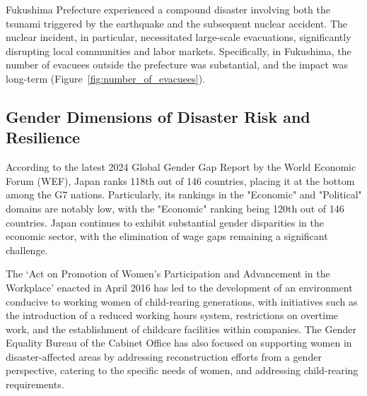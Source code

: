 \documentclass[a4paper,12pt]{article}
\begin{document}
\begin{flushleft}
\begin{table}[h!]
  \vspace{-1.6cm}
\end{table}
\end{flushleft}

Fukushima Prefecture experienced a compound disaster involving both the tsunami triggered by the earthquake and the subsequent nuclear accident. The nuclear incident, in particular, necessitated large-scale evacuations, significantly disrupting local communities and labor markets. Specifically, in Fukushima, the number of evacuees outside the prefecture was substantial, and the impact was long-term (Figure~\ref{fig:number_of_evacuees}). 

\subsection{Gender Dimensions of Disaster Risk and Resilience}
\label{sec5.1}

According to the latest 2024 Global Gender Gap Report by the World Economic Forum (WEF), Japan ranks 118th out of 146 countries, placing it at the bottom among the G7 nations. Particularly, its rankings in the "Economic" and "Political" domains are notably low, with the "Economic" ranking being 120th out of 146 countries. Japan continues to exhibit substantial gender disparities in the economic sector, with the elimination of wage gaps remaining a significant challenge.

The ‘Act on Promotion of Women’s Participation and Advancement in the Workplace’ enacted in April 2016 has led to the development of an environment conducive to working women of child-rearing generations, with initiatives such as the introduction of a reduced working hours system, restrictions on overtime work, and the establishment of childcare facilities within companies. The Gender Equality Bureau of the Cabinet Office has also focused on supporting women in disaster-affected areas by addressing reconstruction efforts from a gender perspective, catering to the specific needs of women, and addressing child-rearing requirements.


\end{document}
